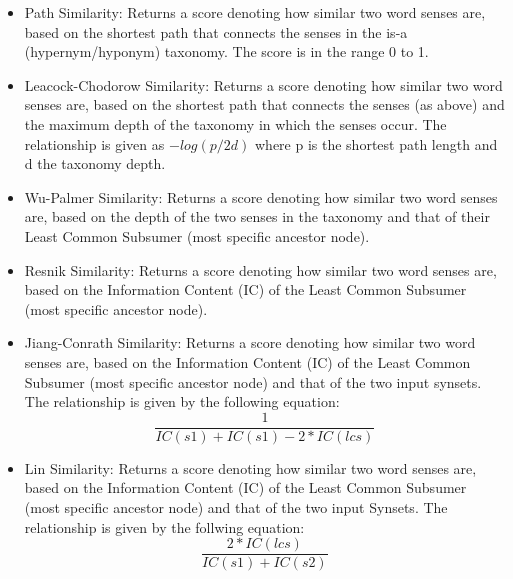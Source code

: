 \documentclass{article}
\begin{document}
\begin{itemize}
	\item Path Similarity: Returns a score denoting how similar two word senses are, based on the shortest path that connects the senses in the is-a (hypernym/hyponym) taxonomy. The score is in the range 0 to 1. %
	\item Leacock-Chodorow Similarity: Returns a score denoting how similar two word senses are, based on the shortest path that connects the senses (as above) and the maximum depth of the taxonomy in which the senses occur. The relationship is given as \(-log(p/2d)\) where p is the shortest path length and d the taxonomy depth. %
	\item Wu-Palmer Similarity: Returns a score denoting how similar two word senses are, based on the depth of the two senses in the taxonomy and that of their Least Common Subsumer (most specific ancestor node). %
	\item Resnik Similarity: Returns a score denoting how similar two word senses are, based on the Information Content (IC) of the Least Common Subsumer (most specific ancestor node). %
	\item Jiang-Conrath Similarity: Returns a score denoting how similar two word senses are, based on the Information Content (IC) of the Least Common Subsumer (most specific ancestor node) and that of the two input synsets. The relationship is given by the following equation:
\begin{equation} \label{eq:jcnsimilarity}
	\frac{1} {IC(s1) + IC(s1) - 2 * IC(lcs)}
\end{equation}
	\item Lin Similarity: Returns a score denoting how similar two word senses are, based on the Information Content (IC) of the Least Common Subsumer (most specific ancestor node) and that of the two input Synsets. The relationship is given by the follwing equation:
\begin{equation} \label{eq:linsimilarity}
	\frac{2 * IC(lcs)} {IC(s1) + IC(s2)} 
\end{equation} 
\end{itemize}
\end{document}
